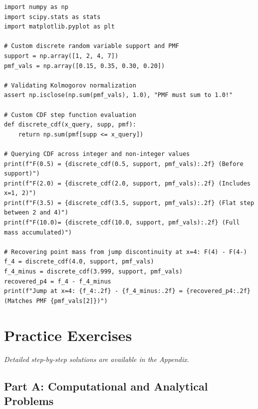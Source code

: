 \begin{lstlisting}[caption={PMF, Step CDF, and Jump Discontinuities in Python}]
import numpy as np
import scipy.stats as stats
import matplotlib.pyplot as plt

# Custom discrete random variable support and PMF
support = np.array([1, 2, 4, 7])
pmf_vals = np.array([0.15, 0.35, 0.30, 0.20])

# Validating Kolmogorov normalization
assert np.isclose(np.sum(pmf_vals), 1.0), "PMF must sum to 1.0!"

# Custom CDF step function evaluation
def discrete_cdf(x_query, supp, pmf):
    return np.sum(pmf[supp <= x_query])

# Querying CDF across integer and non-integer values
print(f"F(0.5) = {discrete_cdf(0.5, support, pmf_vals):.2f} (Before support)")
print(f"F(2.0) = {discrete_cdf(2.0, support, pmf_vals):.2f} (Includes x=1, 2)")
print(f"F(3.5) = {discrete_cdf(3.5, support, pmf_vals):.2f} (Flat step between 2 and 4)")
print(f"F(10.0)= {discrete_cdf(10.0, support, pmf_vals):.2f} (Full mass accumulated)")

# Recovering point mass from jump discontinuity at x=4: F(4) - F(4-)
f_4 = discrete_cdf(4.0, support, pmf_vals)
f_4_minus = discrete_cdf(3.999, support, pmf_vals)
recovered_p4 = f_4 - f_4_minus
print(f"Jump at x=4: {f_4:.2f} - {f_4_minus:.2f} = {recovered_p4:.2f} (Matches PMF {pmf_vals[2]})")
\end{lstlisting}

\newpage
\section{Practice Exercises}
\textit{Detailed step-by-step solutions are available in the Appendix.}

\subsection*{Part A: Computational and Analytical Problems}

